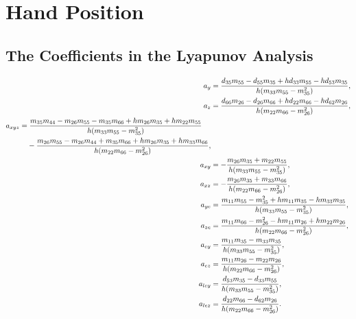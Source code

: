 \chapter{Hand Position}
\label{app:handpos}

\section{The Coefficients in the Lyapunov Analysis}
\label{app:V_omega_dot}
\begin{subequations}
    \begin{align}
        a_y &= \frac{d_{35}m_{55} - d_{55}m_{35} + hd_{33}m_{55} - hd_{53}m_{35}}{h(m_{33}m_{55}-m_{35}^2)},\\
        a_z &= \frac{d_{66}m_{26}-d_{26}m_{66} + hd_{22}m_{66} - hd_{62}m_{26}}{h(m_{22}m_{66}- m_{26}^2)},\\
        \begin{split}
            a_{xyz} &= \frac{m_{35}m_{44} - m_{26}m_{55} - m_{35}m_{66} + hm_{26}m_{35} + hm_{22}m_{55}}{h(m_{33}m_{55}-m_{35}^2)}\\
            &\hphantom{=}\;- \frac{m_{26}m_{55} - m_{26}m_{44} + m_{35}m_{66} + hm_{26}m_{35} + hm_{33}m_{66}}{h(m_{22}m_{66}- m_{26}^2)},
        \end{split}\\
        a_{xy} &= -\frac{m_{26}m_{35} + m_{22}m_{55}}{h(m_{33}m_{55}- m_{35}^2)},\\
        a_{xz} &= -\frac{m_{26}m_{35} + m_{33}m_{66}}{h(m_{22}m_{66}- m_{26}^2)},\\
        a_{ye} &= \frac{m_{11}m_{55} - m_{35}^2 + hm_{11}m_{35} - hm_{33}m_{35}}{h(m_{33}m_{55}- m_{35}^2)},\\
        a_{ze} &= \frac{m_{11}m_{66} - m_{26}^2 - hm_{11}m_{26} + hm_{22}m_{26}}{h(m_{22}m_{66}- m_{26}^2)},\\
        a_{ey} &= \frac{m_{11}m_{35} - m_{33}m_{35}}{h(m_{33}m_{55}- m_{35}^2)},\\
        a_{ez} &= \frac{m_{11}m_{26} - m_{22}m_{26}}{h(m_{22}m_{66}- m_{26}^2)},\\
        a_{ley} &= \frac{d_{53}m_{35} - d_{33}m_{55}}{h(m_{33}m_{55}- m_{35}^2)},\\
        a_{lez} &= \frac{d_{22}m_{66} - d_{62}m_{26}}{h(m_{22}m_{66}- m_{26}^2)}.
    \end{align}
\end{subequations}

